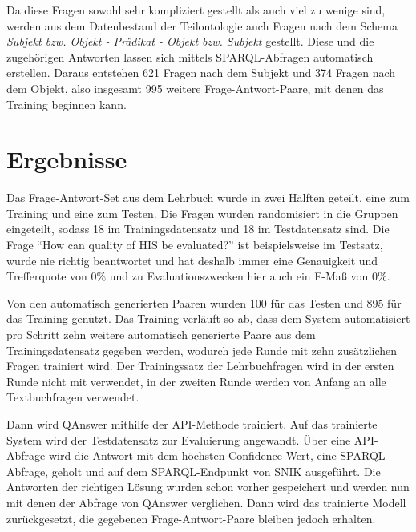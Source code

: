 \documentclass[utf8,biblatex]{lni}
\begin{document}
Da diese Fragen sowohl sehr kompliziert gestellt als auch viel zu wenige sind, werden aus dem Datenbestand der Teilontologie auch Fragen nach dem Schema \emph{Subjekt bzw. Objekt - Prädikat - Objekt bzw. Subjekt} gestellt.
Diese und die zugehörigen Antworten lassen sich mittels SPARQL-Abfragen automatisch erstellen.
Daraus entstehen 621 Fragen nach dem Subjekt und 374 Fragen nach dem Objekt, also insgesamt 995 weitere Frage-Antwort-Paare, mit denen das Training beginnen kann.

\section{Ergebnisse}

Das Frage-Antwort-Set aus dem Lehrbuch wurde in zwei Hälften geteilt, eine zum Training und eine zum Testen.
Die Fragen wurden randomisiert in die Gruppen eingeteilt, sodass 18 im Trainingsdatensatz und 18 im Testdatensatz sind.
Die Frage \enquote{How can quality of HIS be evaluated?} ist beispielsweise im Testsatz, wurde nie richtig beantwortet und hat deshalb immer eine Genauigkeit und Trefferquote von $0\%$ und zu Evaluationszwecken hier auch ein F-Maß von $0\%$.

Von den automatisch generierten Paaren wurden 100 für das Testen und 895 für das Training genutzt.
Das Training verläuft so ab, dass dem System automatisiert pro Schritt zehn weitere automatisch generierte Paare aus dem Trainingsdatensatz gegeben werden,
wodurch jede Runde mit zehn zusätzlichen Fragen trainiert wird.
Der Trainingssatz der Lehrbuchfragen wird in der ersten Runde nicht mit verwendet,
in der zweiten Runde werden von Anfang an alle Textbuchfragen verwendet.

Dann wird QAnswer mithilfe der API-Methode trainiert.
Auf das trainierte System wird der Testdatensatz zur Evaluierung angewandt.
Über eine API-Abfrage wird die Antwort mit dem höchsten Confidence-Wert, eine SPARQL-Abfrage, geholt und auf dem SPARQL-Endpunkt von SNIK ausgeführt.
Die Antworten der richtigen Lösung wurden schon vorher gespeichert und werden nun mit denen der Abfrage von QAnswer verglichen.
Dann wird das trainierte Modell zurückgesetzt, die gegebenen Frage-Antwort-Paare bleiben jedoch erhalten.
\end{document}
